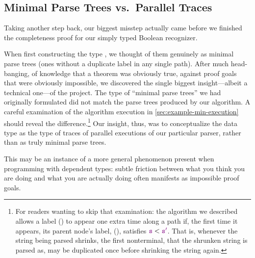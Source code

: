   \subsection{Minimal Parse Trees vs.~Parallel Traces}
    Taking another step back, our biggest misstep actually came before we finished the completeness proof for our simply typed Boolean recognizer.

    When first constructing the type , we thought of them genuinely as minimal parse trees (ones without a duplicate label in any single path).  After much head-banging, of knowledge that a theorem was obviously true, against proof goals that were obviously impossible, we discovered the single biggest insight---albeit a technical one---of the project.  The type of ``minimal parse trees'' we had originally formulated did not match the parse trees produced by our algorithm.  A careful examination of the algorithm execution in \autoref{sec:example-min-execution} should reveal the difference.\footnote{For readers wanting to skip that examination: the algorithm we described allows a label () to appear one extra time along a path if, the first time it appears, its parent node's label, (), satisfies $\textcolor{violet}{\texttt{s}} < \textcolor{violet}{\texttt{s$'$}}$.  That is, whenever the string being parsed shrinks, the first nonterminal, that the shrunken string is parsed as, may be duplicated once before shrinking the string again.}  Our insight, thus, was to conceptualize the data type as the type of traces of parallel executions of our particular parser, rather than as truly minimal parse trees.

    This may be an instance of a more general phenomenon present when programming with dependent types: subtle friction between what you think you are doing and what you are actually doing often manifests as impossible proof goals.